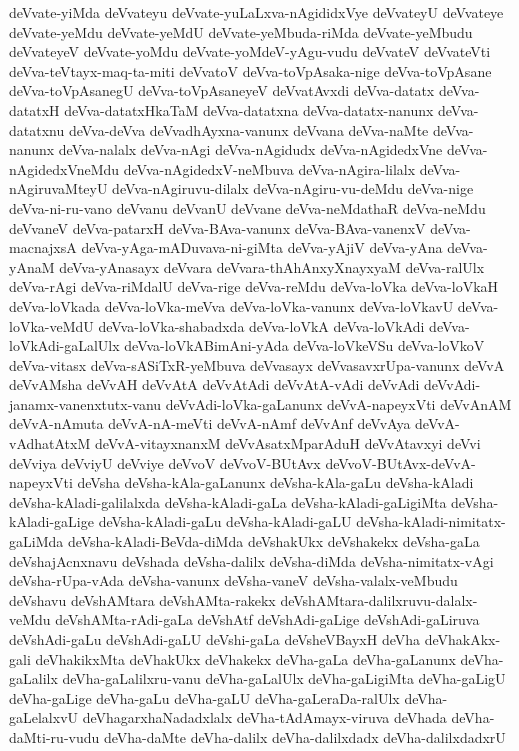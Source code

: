 {deVvate-yiMda
deVvateyu
deVvate-yuLaLxva-nAgididxVye
deVvateyU
deVvateye
deVvate-yeMdu
deVvate-yeMdU
deVvate-yeMbuda-riMda
deVvate-yeMbudu
deVvateyeV
deVvate-yoMdu
deVvate-yoMdeV-yAgu-vudu
deVvateV
deVvateVti
deVva-teVtayx-maq-ta-miti
deVvatoV
deVva-toVpAsaka-nige
deVva-toVpAsane
deVva-toVpAsanegU
deVva-toVpAsaneyeV
deVvatAvxdi
deVva-datatx
deVva-datatxH
deVva-datatxHkaTaM
deVva-datatxna
deVva-datatx-nanunx
deVva-datatxnu
deVva-deVva
deVvadhAyxna-vanunx
deVvana
deVva-naMte
deVva-nanunx
deVva-nalalx
deVva-nAgi
deVva-nAgidudx
deVva-nAgidedxVne
deVva-nAgidedxVneMdu
deVva-nAgidedxV-neMbuva
deVva-nAgira-lilalx
deVva-nAgiruvaMteyU
deVva-nAgiruvu-dilalx
deVva-nAgiru-vu-deMdu
deVva-nige
deVva-ni-ru-vano
deVvanu
deVvanU
deVvane
deVva-neMdathaR
deVva-neMdu
deVvaneV
deVva-patarxH
deVva-BAva-vanunx
deVva-BAva-vanenxV
deVva-macnajxsA
deVva-yAga-mADuvava-ni-giMta
deVva-yAjiV
deVva-yAna
deVva-yAnaM
deVva-yAnasayx
deVvara
deVvara-thAhAnxyXnayxyaM
deVva-ralUlx
deVva-rAgi
deVva-riMdalU
deVva-rige
deVva-reMdu
deVva-loVka
deVva-loVkaH
deVva-loVkada
deVva-loVka-meVva
deVva-loVka-vanunx
deVva-loVkavU
deVva-loVka-veMdU
deVva-loVka-shabadxda
deVva-loVkA
deVva-loVkAdi
deVva-loVkAdi-gaLalUlx
deVva-loVkABimAni-yAda
deVva-loVkeVSu
deVva-loVkoV
deVva-vitasx
deVva-sASiTxR-yeMbuva
deVvasayx
deVvasavxrUpa-vanunx
deVvA
deVvAMsha
deVvAH
deVvAtA
deVvAtAdi
deVvAtA-vAdi
deVvAdi
deVvAdi-janamx-vanenxtutx-vanu
deVvAdi-loVka-gaLanunx
deVvA-napeyxVti
deVvAnAM
deVvA-nAmuta
deVvA-nA-meVti
deVvA-nAmf
deVvAnf
deVvAya
deVvA-vAdhatAtxM
deVvA-vitayxnanxM
deVvAsatxMparAduH
deVvAtavxyi
deVvi
deVviya
deVviyU
deVviye
deVvoV
deVvoV-BUtAvx
deVvoV-BUtAvx-deVvA-napeyxVti
deVsha
deVsha-kAla-gaLanunx
deVsha-kAla-gaLu
deVsha-kAladi
deVsha-kAladi-galilalxda
deVsha-kAladi-gaLa
deVsha-kAladi-gaLigiMta
deVsha-kAladi-gaLige
deVsha-kAladi-gaLu
deVsha-kAladi-gaLU
deVsha-kAladi-nimitatx-gaLiMda
deVsha-kAladi-BeVda-diMda
deVshakUkx
deVshakekx
deVsha-gaLa
deVshajAcnxnavu
deVshada
deVsha-dalilx
deVsha-diMda
deVsha-nimitatx-vAgi
deVsha-rUpa-vAda
deVsha-vanunx
deVsha-vaneV
deVsha-valalx-veMbudu
deVshavu
deVshAMtara
deVshAMta-rakekx
deVshAMtara-dalilxruvu-dalalx-veMdu
deVshAMta-rAdi-gaLa
deVshAtf
deVshAdi-gaLige
deVshAdi-gaLiruva
deVshAdi-gaLu
deVshAdi-gaLU
deVshi-gaLa
deVsheVBayxH
deVha
deVhakAkx-gali
deVhakikxMta
deVhakUkx
deVhakekx
deVha-gaLa
deVha-gaLanunx
deVha-gaLalilx
deVha-gaLalilxru-vanu
deVha-gaLalUlx
deVha-gaLigiMta
deVha-gaLigU
deVha-gaLige
deVha-gaLu
deVha-gaLU
deVha-gaLeraDa-ralUlx
deVha-gaLelalxvU
deVhagarxhaNadadxlalx
deVha-tAdAmayx-viruva
deVhada
deVha-daMti-ru-vudu
deVha-daMte
deVha-dalilx
deVha-dalilxdadx
deVha-dalilxdadxrU
}
